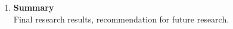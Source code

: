 \begin{minipage}{\textwidth}
\begin{enumerate}
             \item \textbf{Summary} \\
             Final research results, recommendation for future research. 
    \end{enumerate}
    
             
             
             
             
             
             
             
             

\end{minipage}


